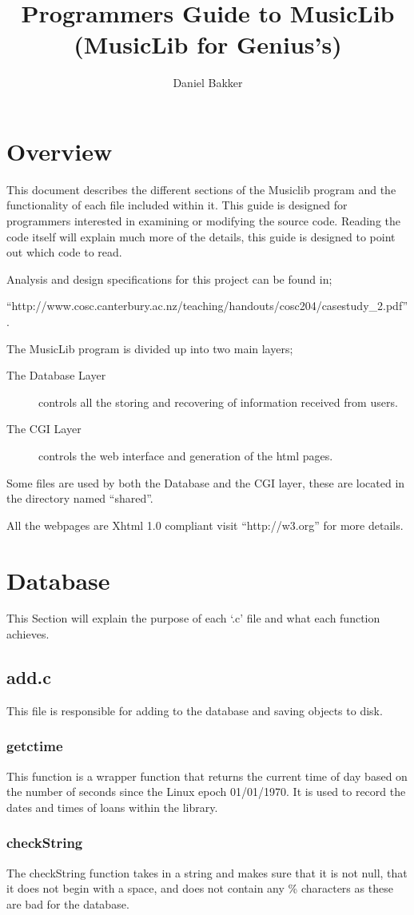 \documentclass{article}
\title{Programmers Guide to MusicLib (MusicLib for Genius's)}
\author{Daniel Bakker}
\begin{document}
\tableofcontents
\newpage
\section{Overview}
This document describes the different sections of the Musiclib program and the functionality of each file included within it. This guide is designed for programmers interested in examining or modifying the source code. Reading the code itself will explain much more of the details, this guide is designed to point out which code to read.

Analysis and design specifications for this project can be found in;

 ``http://www.cosc.canterbury.ac.nz/teaching/handouts/cosc204/casestudy\_2.pdf''.

The MusicLib program is divided up into two main layers;
\begin{description} 
\item[The Database Layer] controls all the storing and recovering of information received from users.
\item[The CGI Layer] controls the web interface and generation of the html pages.
\end{description}

Some files are used by both the Database and the CGI layer, these are located in the directory named ``shared''.

All the webpages are Xhtml 1.0 compliant visit ``http://w3.org'' for more details.

\section{Database}
This Section will explain the purpose of each `.c' file and what each function achieves.
\subsection{add.c}
This file is responsible for adding to the database and saving objects to disk.

\subsubsection*{getctime}
 This function is a wrapper function that returns the current time of day based on the number of seconds since the Linux epoch 01/01/1970. It is used to record the dates and times of loans within the library.

\subsubsection*{checkString}
 The checkString function takes in a string and makes sure that it is not null, that it does not begin with a space,  and does not contain any \% characters as these are bad for the database.
\end{document}
